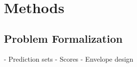 \section{Methods}

\subsection{Problem Formalization}
\noindent - Prediction sets
- Scores
- Envelope design